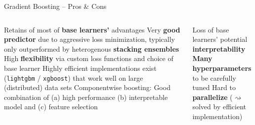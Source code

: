 \begin{frame}{Gradient Boosting -- Pros \& Cons}

\footnotesize

\begin{columns}[onlytextwidth]
  \begin{column}{0.5\textwidth}
    \footnotesize
    \begin{itemize}
      \positem Retains of most of \textbf{base learners'} advantages 
      \positem Very \textbf{good predictor} due to aggressive loss minimization, typically only outperformed by heterogenous \textbf{stacking ensembles}
      \positem High \textbf{flexibility} via custom loss functions and choice of base learner
      \positem Highly efficient implementations exist (\texttt{lightgbm} / \texttt{xgboost}) that work well on large (distributed) data sets
      \positem Componentwise boosting: Good combination of (a) high performance (b) interpretable model and (c) feature selection
    \end{itemize}
  \end{column}
  \begin{column}{0.5\textwidth}
    \footnotesize
    \begin{itemize}
      \negitem Loss of base learners' potential \textbf{interpretability}
      \negitem \textbf{Many hyperparameters} 
      to be carefully tuned
      \negitem Hard to \textbf{parallelize} ($\rightsquigarrow$ solved by efficient implementation)
    \end{itemize}
  \end{column}
\end{columns}

\end{frame}